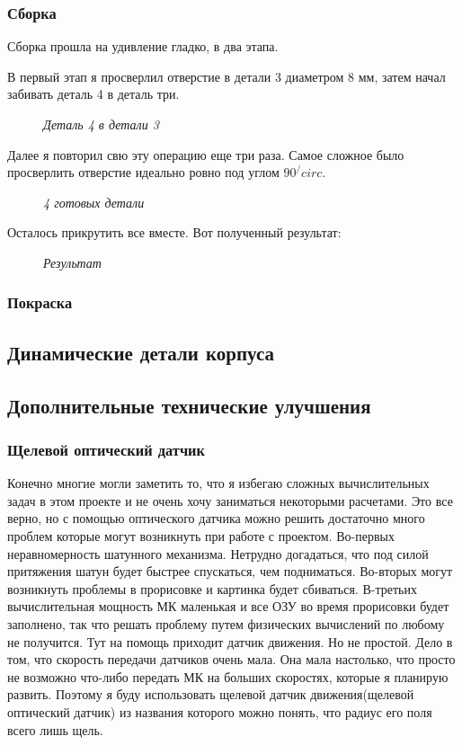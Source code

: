 \documentclass[a4paper, 12pt]{article}
\newcommand{\image}[3]{
	\begin{figure}[ht]
		\center{\texttt{[image: img/\#1]} }
		\caption{\textit{#3}}\end{figure}
}
\begin{document}
\subsubsection{Сборка}

Сборка прошла на удивление гладко, в два этапа.

В первый этап я просверлил отверстие в детали 3 диаметром 8 мм, затем
начал забивать деталь 4 в деталь три.

\image{Одна деталь.jpg}{200}{Деталь 4 в детали 3}

Далее я повторил свю эту операцию еще три раза. Самое сложное было просверлить
отверстие идеально ровно под углом $90^/circ$.

\image{4 детали.jpg}{200}{4 готовых детали}
Осталось прикрутить все вместе. Вот полученный результат:

\image{Получившаяся_конструкция.jpg}{200}{Результат}

\subsubsection{Покраска}
\newpage

\subsection{Динамические детали корпуса}


\subsection{Дополнительные технические улучшения}

\subsubsection{Щелевой оптический датчик}

Конечно многие могли заметить то, что я избегаю сложных вычислительных
задач в этом проекте и не очень хочу заниматься некоторыми расчетами. Это все
верно, но с помощью оптического датчика можно решить достаточно много проблем
которые могут возникнуть при работе с проектом. Во-первых неравномерность
шатунного механизма. Нетрудно догадаться, что под силой притяжения шатун будет
быстрее спускаться, чем подниматься. Во-вторых могут возникнуть проблемы
в прорисовке и картинка будет сбиваться. В-третьих вычислительная мощность МК
маленькая и все ОЗУ во время прорисовки будет заполнено, так что решать
проблему путем физических вычислений по любому не получится. Тут на помощь
приходит датчик движения. Но не простой. Дело в том, что скорость передачи
датчиков очень мала. Она мала настолько, что просто не возможно что-либо
передать МК на больших скоростях, которые я планирую развить. Поэтому я буду
использовать щелевой датчик движения(щелевой оптический датчик) из названия
которого можно понять, что радиус его поля всего лишь щель.
\end{document}
